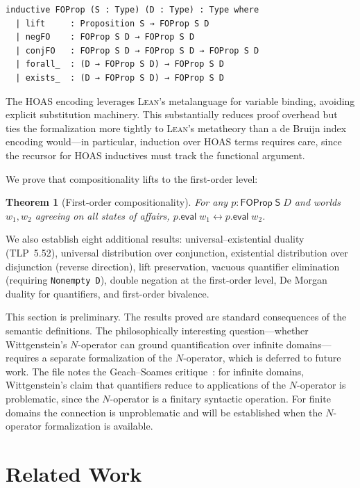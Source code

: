\documentclass[10pt, letterpaper]{article}
\newtheorem{theorem}{Theorem}[section]
\theoremstyle{definition}
\theoremstyle{remark}
\newcommand{\Sach}{\mathsf{S}}
\newcommand{\eval}{\mathsf{eval}}
\newcommand{\Lean}{\textsc{Lean}}
\begin{document}
\begin{lstlisting}
inductive FOProp (S : Type) (D : Type) : Type where
  | lift     : Proposition S → FOProp S D
  | negFO    : FOProp S D → FOProp S D
  | conjFO   : FOProp S D → FOProp S D → FOProp S D
  | forall_  : (D → FOProp S D) → FOProp S D
  | exists_  : (D → FOProp S D) → FOProp S D
\end{lstlisting}

\noindent
The HOAS encoding leverages \Lean's metalanguage for variable
binding, avoiding explicit substitution machinery.  This
substantially reduces proof overhead but ties the formalization
more tightly to \Lean's metatheory than a de Bruijn index
encoding would---in particular, induction over HOAS terms
requires care, since the recursor for HOAS inductives must track
the functional argument.

We prove that compositionality lifts to the first-order level:

\begin{theorem}[First-order compositionality]
\label{thm:fo-comp}
For any $p : \mathsf{FOProp}\;\Sach\;D$ and worlds $w_1, w_2$
agreeing on all states of affairs, $p.\eval\;w_1 \leftrightarrow
p.\eval\;w_2$.
\end{theorem}

\noindent
We also establish eight additional results: universal--existential
duality (TLP~5.52), universal distribution over conjunction,
existential distribution over disjunction (reverse direction),
lift preservation, vacuous quantifier elimination (requiring
\texttt{Nonempty D}), double negation at the first-order level,
De Morgan duality for quantifiers, and first-order bivalence.

This section is preliminary.  The results proved are standard
consequences of the semantic definitions.  The philosophically
interesting question---whether Wittgenstein's $N$-operator can
ground quantification over infinite domains---requires a
separate formalization of the $N$-operator, which is deferred to
future work.  The file notes the
Geach--Soames critique~\cite{geach1981,soames1983}: for infinite
domains, Wittgenstein's claim that quantifiers reduce to
applications of the $N$-operator is problematic, since the
$N$-operator is a finitary syntactic operation.  For finite
domains the connection is unproblematic and will be established
when the $N$-operator formalization is available.

\section{Related Work}
\label{sec:related}
\end{document}
